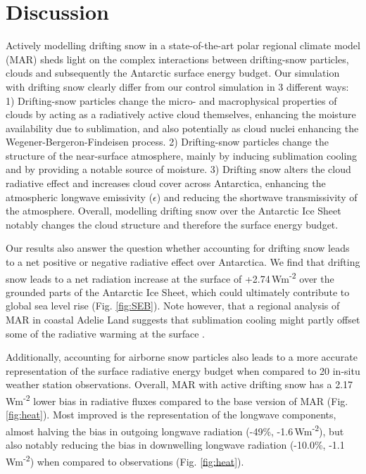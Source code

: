 \documentclass[draft]{agujournal2019}
\begin{document}
\section*{Discussion}

Actively modelling drifting snow in a state-of-the-art polar regional climate model (MAR) sheds light on the complex interactions between drifting-snow particles, clouds and subsequently the Antarctic surface energy budget. Our simulation with drifting snow clearly differ from our control simulation in 3 different ways:
1) Drifting-snow particles change the micro- and macrophysical properties of clouds by acting as a radiatively active cloud themselves, enhancing the moisture availability due to sublimation, and also potentially as cloud nuclei enhancing the Wegener-Bergeron-Findeisen process.
2) Drifting-snow particles change the structure of the near-surface atmosphere, mainly by inducing sublimation cooling and by providing a notable source of moisture.
3) Drifting snow alters the cloud radiative effect and increases cloud cover across Antarctica, enhancing the atmospheric longwave emissivity ($\epsilon$) and reducing the shortwave transmissivity of the atmosphere. 
Overall, modelling drifting snow over the Antarctic Ice Sheet notably changes the cloud structure and therefore the surface energy budget.

Our results also answer the question whether accounting for drifting snow leads to a net positive or negative radiative effect over Antarctica. We find that drifting snow leads to a net radiation increase at the surface of +2.74\,Wm\textsuperscript{-2} over the grounded parts of the Antarctic Ice Sheet, which could ultimately contribute to global sea level rise (Fig. \ref{fig:SEB}). Note however, that a regional analysis of MAR in coastal Adelie Land suggests that sublimation cooling might partly offset some of the radiative warming at the surface \cite{Letoumelin2020}.

Additionally, accounting for airborne snow particles also leads to a more accurate representation of the surface radiative energy budget when compared to 20 in-situ weather station observations. Overall, MAR with active drifting snow has a 2.17\,Wm\textsuperscript{-2} lower bias in radiative fluxes compared to the base version of MAR (Fig. \ref{fig:heat}). Most improved is the representation of the longwave components, almost halving the bias in outgoing longwave radiation (-49\%, -1.6\,Wm\textsuperscript{-2}), but also notably reducing the bias in downwelling longwave radiation (-10.0\%, -1.1\,Wm\textsuperscript{-2}) when compared to observations (Fig. \ref{fig:heat}).
\end{document}
